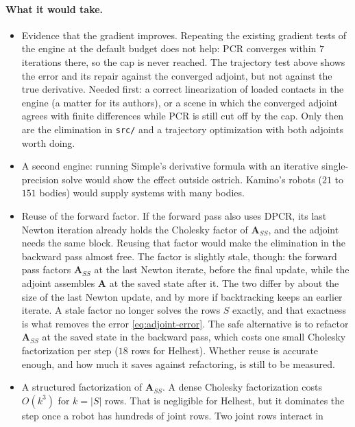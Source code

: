 \paragraph{What it would take.}
\begin{itemize}
  \item Evidence that the gradient improves. Repeating the existing
    gradient tests of the engine at the default budget does not help: PCR converges within $7$ iterations there, so
    the cap is never reached. The trajectory test above shows the error
    and its repair against the converged adjoint, but not against the
    true derivative. Needed first: a correct linearization of loaded
    contacts in the engine (a matter for its authors), or a scene in
    which the converged adjoint agrees with finite differences while PCR
    is still cut off by the cap. Only then are the elimination in
    \texttt{src/} and a trajectory optimization with both adjoints worth
    doing.
  \item A second engine: running Simple's derivative formula with an
    iterative single-precision solve would show the effect outside
    ostrich. Kamino's robots ($21$ to $151$ bodies) would supply systems
    with many bodies.
  \item Reuse of the forward factor. If the forward pass also uses DPCR,
    its last Newton iteration already holds the Cholesky factor of
    $\mathbf{A}_{SS}$, and the adjoint needs the same block. Reusing that
    factor would make the elimination in the backward pass almost free. The
    factor is slightly stale, though: the forward pass factors
    $\mathbf{A}_{SS}$ at the last Newton iterate, before the final
    update, while the adjoint assembles $\mathbf{A}$ at the saved state
    after it. The two differ by about the size of the last Newton
    update, and by more if backtracking keeps an earlier iterate. A stale
    factor no longer solves the rows $S$ exactly, and that exactness is
    what removes the error \eqref{eq:adjoint-error}. The safe alternative
    is to refactor $\mathbf{A}_{SS}$ at the saved state in the backward
    pass, which costs one small Cholesky factorization per step ($18$ rows
    for Helhest). Whether reuse is accurate enough, and how much it saves
    against refactoring, is still to be measured.
  \item A structured factorization of $\mathbf{A}_{SS}$. A dense
    Cholesky factorization costs $O(k^3)$ for $k = |S|$ rows. That is
    negligible for Helhest, but it dominates the step once a robot has
    hundreds of joint rows. Two joint rows interact in

\end{itemize}
